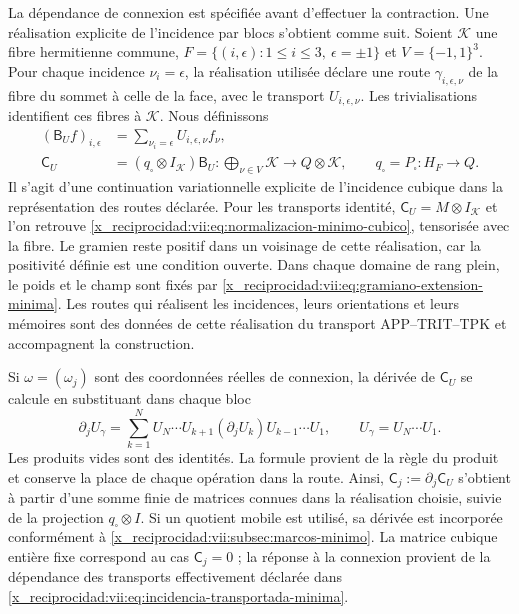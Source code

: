 La dépendance de connexion est spécifiée avant d'effectuer la
contraction. Une réalisation explicite de l'incidence par blocs
s'obtient comme suit. Soient \(\mathcal K\) une fibre hermitienne commune,
\(F=\{(i,\epsilon):1\leq i\leq3,\ \epsilon=\pm1\}\) et
\(V=\{-1,1\}^3\). Pour chaque incidence \(\nu_i=\epsilon\),
la réalisation utilisée déclare une route \(\gamma_{i,\epsilon,\nu}\)
de la fibre du sommet à celle de la face, avec le transport
\(U_{i,\epsilon,\nu}\). Les trivialisations identifient ces fibres
à \(\mathcal K\). Nous définissons
\begin{equation}
 \begin{split}
 (\mathsf B_Uf)_{i,\epsilon}
   &=\sum_{\nu_i=\epsilon}U_{i,\epsilon,\nu}f_\nu,\\
 \mathsf C_U&=(q_\square\otimes I_{\mathcal K})\mathsf B_U:
   \bigoplus_{\nu\in V}\mathcal K\longrightarrow Q\otimes\mathcal K,
 \qquad q_\square=P_\square:H_F\to Q.
 \end{split}
 \label{x_reciprocidad:vii:eq:incidencia-transportada-minima}
\end{equation}
Il s'agit d'une continuation variationnelle explicite de l'incidence cubique
dans la représentation des routes déclarée. Pour les transports identité,
\(\mathsf C_U=M\otimes I_{\mathcal K}\) et l'on retrouve
\eqref{x_reciprocidad:vii:eq:normalizacion-minimo-cubico}, tensorisée avec la fibre.
Le gramien reste positif dans un voisinage de cette réalisation,
car la positivité définie est une condition ouverte. Dans chaque domaine
de rang plein, le poids et le champ sont fixés par
\eqref{x_reciprocidad:vii:eq:gramiano-extension-minima}. Les routes qui réalisent les
incidences, leurs orientations et leurs mémoires sont des données de cette
réalisation du transport APP--TRIT--TPK et accompagnent la construction.

Si \(\omega=(\omega_j)\) sont des coordonnées réelles de connexion, la dérivée de \(\mathsf C_U\) se calcule en substituant dans chaque bloc
\begin{equation}
 \partial_j U_\gamma
 =\sum_{k=1}^{N}
    U_N\cdots U_{k+1}(\partial_jU_k)U_{k-1}\cdots U_1,
 \qquad U_\gamma=U_N\cdots U_1.
 \label{x_reciprocidad:vii:eq:derivada-incidencia-rutas}
\end{equation}
Les produits vides sont des identités. La formule provient de la règle du produit et conserve la place de chaque opération dans la route. Ainsi, \(\mathsf C_j:=\partial_j\mathsf C_U\) s'obtient à partir d'une somme finie de matrices connues dans la réalisation choisie, suivie de la projection \(q_\square\otimes I\). Si un quotient mobile est utilisé, sa dérivée est incorporée conformément à \ref{x_reciprocidad:vii:subsec:marcos-minimo}. La matrice cubique entière fixe correspond au cas \(\mathsf C_j=0\) ; la réponse à la connexion provient de la dépendance des transports effectivement déclarée dans \eqref{x_reciprocidad:vii:eq:incidencia-transportada-minima}.

